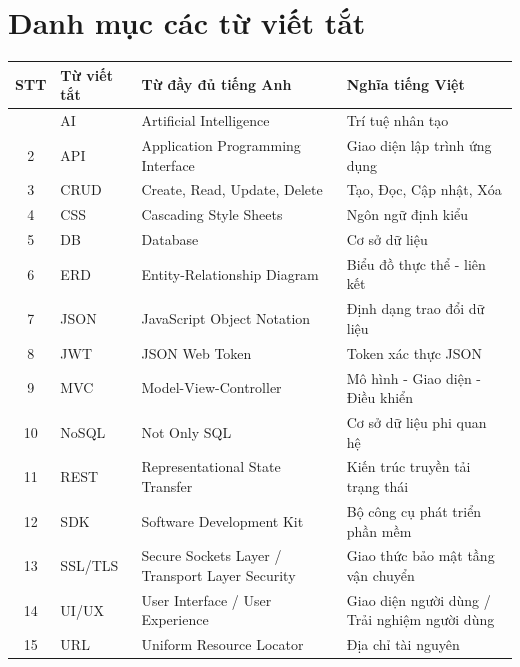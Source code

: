 
\chapter*{Danh mục các từ viết tắt}

\vspace{0.5cm}

\begin{longtable}{|c|p{3cm}|p{6cm}|p{4cm}|}
    \hline
    \textbf{STT} & \textbf{Từ viết tắt} & \textbf{Từ đầy đủ tiếng Anh} & \textbf{Nghĩa tiếng Việt} \\
    \hline
    \endhead
    \hline
    \endfoot
    1 & AI & Artificial Intelligence & Trí tuệ nhân tạo \\
    \hline
    2 & API & Application Programming Interface & Giao diện lập trình ứng dụng \\
    \hline
    3 & CRUD & Create, Read, Update, Delete & Tạo, Đọc, Cập nhật, Xóa \\
    \hline
    4 & CSS & Cascading Style Sheets & Ngôn ngữ định kiểu \\
    \hline
    5 & DB & Database & Cơ sở dữ liệu \\
    \hline
    6 & ERD & Entity-Relationship Diagram & Biểu đồ thực thể - liên kết \\
    \hline
    7 & JSON & JavaScript Object Notation & Định dạng trao đổi dữ liệu \\
    \hline
    8 & JWT & JSON Web Token & Token xác thực JSON \\
    \hline
    9 & MVC & Model-View-Controller & Mô hình - Giao diện - Điều khiển \\
    \hline
    10 & NoSQL & Not Only SQL & Cơ sở dữ liệu phi quan hệ \\
    \hline
    11 & REST & Representational State Transfer & Kiến trúc truyền tải trạng thái \\
    \hline
    12 & SDK & Software Development Kit & Bộ công cụ phát triển phần mềm \\
    \hline
    13 & SSL/TLS & Secure Sockets Layer / Transport Layer Security & Giao thức bảo mật tầng vận chuyển \\
    \hline
    14 & UI/UX & User Interface / User Experience & Giao diện người dùng / Trải nghiệm người dùng \\
    \hline
    15 & URL & Uniform Resource Locator & Địa chỉ tài nguyên \\
    \hline
\end{longtable}

\newpage
